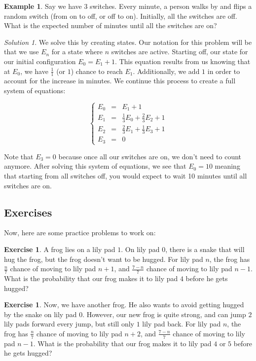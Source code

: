 \documentclass[letterpaper]{article}
\theoremstyle{definition}
\newtheorem{example}[thm]{Example}
\theoremstyle{remark}
\newtheorem*{solution}{Solution}
\theoremstyle{definition}
\newtheorem{exercise}[thm]{Exercise}
\begin{document}
\begin{example}
Say we have 3 switches. Every minute, a person walks by and flips a random switch (from on to off, or off to on). Initially, all the switches are off. What is the expected number of minutes until all the switches are on?
\end{example}

\begin{solution}
We solve this by creating states. Our notation for this problem will be that we use $E_{n}$ for a state where $n$ switches are active. Starting off, our state for our initial configuration $E_{0} = E_{1} + 1$. This equation results from us knowing that at $E_{0}$, we have $\frac{1}{1}$ (or $1$) chance to reach $E_{1}$. Additionally, we add $1$ in order to account for the increase in minutes. We continue this process to create a full system of equations:

\[ \left\{ 
    \begin{array}{lcl} 
        E_{0} &= &E_{1} + 1\\
        E_{1} &= &\frac{1}{3}E_{0} + \frac{2}{3}E_{2} + 1\\
        E_{2} &= &\frac{2}{3}E_{1} + \frac{1}{3}E_{3} + 1\\
        E_{3} &= &0
\end{array}
\right.\]

Note that $E_{3} = 0$ because once all our switches are on, we don't need to count anymore. After solving this system of equations, we see that $E_{0} = 10$ meaning that starting from all switches off, you would expect to wait 10 minutes until all switches are on. 
\end{solution}

\subsection*{Exercises}
Now, here are some practice problems to work on:

\begin{exercise}
    A frog lies on a lily pad $1$. On lily pad $0$, there is a snake that will hug the frog, but the frog doesn't want to be hugged. For lily pad $n$, the frog has $\frac{n}{7}$ chance of moving to lily pad $n+1$, and $\frac{7-n}{7}$ chance of moving to lily pad $n-1$. What is the probability that our frog makes it to lily pad $4$ before he gets hugged?
\end{exercise}

\begin{exercise}
    Now, we have another frog. He also wants to avoid getting hugged by the snake on lily pad $0$. However, our new frog is quite strong, and can jump $2$ lily pads forward every jump, but still only $1$ lily pad back. For lily pad $n$, the frog has $\frac{n}{7}$ chance of moving to lily pad $n+2$, and $\frac{7-n}{7}$ chance of moving to lily pad $n-1$. What is the probability that our frog makes it to lily pad $4$ or $5$ before he gets hugged?
\end{exercise}
\end{document}

